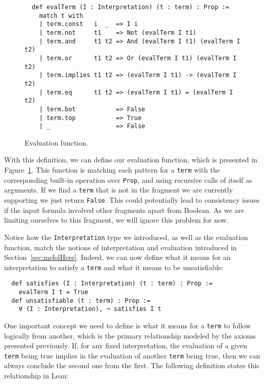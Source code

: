 \begin{figure}[t]
\begin{verbatim}
  def evalTerm (I : Interpretation) (t : term) : Prop :=
    match t with
    | term.const   i  _  => I i
    | term.not     t1    => Not (evalTerm I t1)
    | term.and     t1 t2 => And (evalTerm I t1) (evalTerm I t2)
    | term.or      t1 t2 => Or (evalTerm I t1) (evalTerm I t2)
    | term.implies t1 t2 => (evalTerm I t1) -> (evalTerm I t2)
    | term.eq      t1 t2 => (evalTerm I t1) = (evalTerm I t2)
    | term.bot           => False
    | term.top           => True
    | _                  => False
\end{verbatim}
\caption{Evaluation function.}\label{evalTerm1}
\end{figure}

With this definition, we can define our evaluation function, which is presented in
Figure~\ref{evalTerm1}.
This function is matching each pattern for a \texttt{term} with the corresponding built-in operation over \texttt{Prop}, and using recursive calls of itself as arguments. If we find a \texttt{term} that is not in the fragment we are currently supporting we just return \texttt{False}. This could potentially lead to consistency issues if the input formula involved other fragments apart from Boolean. As we are limiting ourselves to this fragment, we will ignore this problem for now.

Notice how the \texttt{Interpretation} type we introduced, as well as the evaluation function, match the notions of interpretation and evaluation introduced in Section~\ref{sec:msfolHere}. Indeed, we can now define what it means for an interpretation to satisfy a \texttt{term} and what it means to be unsatisfiable:

\begin{verbatim}
  def satisfies (I : Interpretation) (t : term) : Prop :=
    evalTerm I t = True
  def unsatisfiable (t : term) : Prop :=
    ∀ (I : Interpretation), ¬ satisfies I t
\end{verbatim}

One important concept we need to define is what it means for a \texttt{term}
to follow logically from another, which is the primary relationship modeled
by the axioms presented previously.
%
If, for any fixed interpretation, the evaluation of a given \texttt{term} being true
implies in the evaluation of another \texttt{term} being true, then we can always
conclude the second one from the first. The following definition states this
relationship in Lean:

